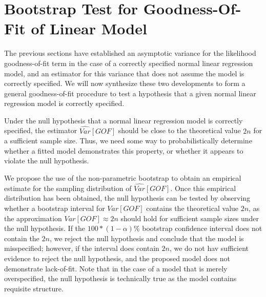 		\section{Bootstrap Test for Goodness-Of-Fit of Linear Model} \label{sec:boot_test}

		The previous sections have established an asymptotic variance for the likelihood goodness-of-fit term in the case of a correctly specified normal linear regression model, and an
		estimator for this variance that does not assume the model is correctly specified. We will now synthesize these two developments to form a general goodness-of-fit procedure to
		test a hypothesis that a given normal linear regression model is correctly specified.

		Under the null hypothesis that a normal linear regression model is correctly specified, the estimator $\widehat{Var}[GOF]$ should be close to the theoretical value $2n$ for a
		sufficient sample size. Thus, we need some way to probabilistically determine whether a fitted model demonstrates this property, or whether it appears to violate the null
		hypothesis.
		
		We propose the use of the non-parametric bootstrap to obtain an empirical estimate for the sampling distribution of $\widehat{Var}[GOF]$. Once this empirical distribution
		has been obtained, the null hypothesis can be tested by observing whether a bootstrap interval for $Var[GOF]$ contains the theoretical value $2n$, as the approximation
		$Var[GOF] \approx 2n$ should hold for sufficient sample sizes under the null hypothesis. If the $100*(1-\alpha)$\% bootstrap confidence interval does not contain the 
		$2n$, we reject the null hypothesis and conclude that the model is misspecified; however, if the interval does contain $2n$, we do not hav sufficient evidence to reject
		the null hypothesis, and the proposed model does not demonstrate lack-of-fit. Note that in the case of a model that is merely overspecified, the null hypothesis is technically
		true as the model contains requisite structure.

